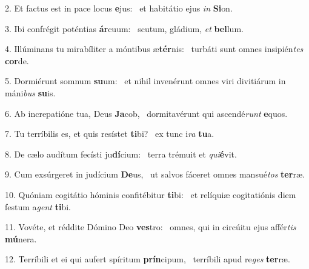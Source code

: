 2. Et factus est in pace locus \textbf{e}jus: \ast\  et habitátio ejus \textit{in} \textbf{Si}on.\

3. Ibi confrégit poténtias \textbf{ár}cuum: \ast\  scutum, gládium, \textit{et} \textbf{bel}lum.\

4. Illúminans tu mirabíliter a móntibus æ\textbf{tér}nis: \ast\  turbáti sunt omnes insipién\textit{tes} \textbf{cor}de.\

5. Dormiérunt somnum \textbf{su}um: \ast\  et nihil invenérunt omnes viri divitiárum in máni\textit{bus} \textbf{su}is.\

6. Ab increpatióne tua, Deus \textbf{Ja}cob, \ast\  dormitavérunt qui ascendé\textit{runt} \textbf{e}quos.\

7. Tu terríbilis es, et quis resístet \textbf{ti}bi? \ast\  ex tunc i\textit{ra} \textbf{tu}a.\

8. De cælo audítum fecísti ju\textbf{dí}cium: \ast\  terra trémuit et \textit{qui}\textbf{é}vit.\

9. Cum exsúrgeret in judícium \textbf{De}us, \ast\  ut salvos fáceret omnes mansué\textit{tos} \textbf{ter}ræ.\

10. Quóniam cogitátio hóminis confitébitur \textbf{ti}bi: \ast\  et relíquiæ cogitatiónis diem festum a\textit{gent} \textbf{ti}bi.\

11. Vovéte, et réddite Dómino Deo \textbf{ves}tro: \ast\  omnes, qui in circúitu ejus affér\textit{tis} \textbf{mú}nera.\

12. Terríbili et ei qui aufert spíritum \textbf{prín}cipum, \ast\  terríbili apud re\textit{ges} \textbf{ter}ræ.\

